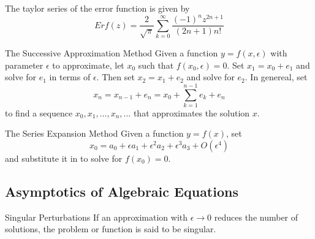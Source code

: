 \documentclass[a4paper]{article}
\begin{document}
\begin{prp}{}{} The taylor series of the error function is given by $$Erf(z)=\frac{2}{\sqrt{\pi}}\sum_{k=0}^\infty\frac{(-1)^nz^{2n+1}}{(2n+1)n!}$$
\end{prp}

\begin{prp}{The Successive Approximation Method}{} Given a function $y=f(x,\epsilon)$ with parameter $\epsilon$ to approximate, let $x_0$ such that $f(x_0,\epsilon)=0$. Set $x_1=x_0+e_1$ and solve for $e_1$ in terms of $\epsilon$. Then set $x_2=x_1+e_2$ and solve for $e_2$. In genereal, set $$x_n=x_{n-1}+e_n=x_0+\sum_{k=1}^{n-1}e_k+e_n$$ to find a sequence $x_0,x_1,\dots,x_n,\dots$ that approximates the solution $x$. 
\end{prp}

\begin{prp}{The Series Expansion Method}{} Given a function $y=f(x)$, set $$x_0=a_0+\epsilon a_1+\epsilon^2 a_2+\epsilon^3 a_3+O(\epsilon^4)$$ and substitute it in to solve for $f(x_0)=0$. 
\end{prp}

\subsection{Asymptotics of Algebraic Equations}
\begin{defn}{Singular Perturbations}{} If an approximation with $\epsilon\to 0$ reduces the number of solutions, the problem or function is said to be singular. 
\end{defn}
\end{document}
